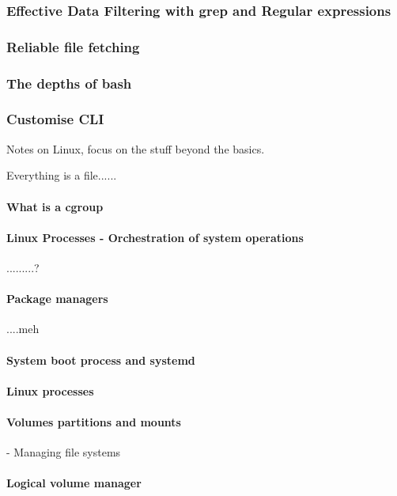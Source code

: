 \documentclass[a4paper, 11pt]{book}
\begin{document}
    \subsubsection{Effective Data Filtering with grep and Regular expressions}
    \subsubsection{Reliable file fetching}
    \subsubsection{The depths of bash}
    \subsubsection{Customise CLI}

    Notes on Linux, focus on the stuff beyond the basics.

    Everything is a file......

    \paragraph{What is a cgroup}

    \paragraph{Linux Processes - Orchestration of system operations}
    .........?

    \paragraph{Package managers}
    ....meh

    \paragraph{System boot process and systemd}

    \paragraph{Linux processes}

    \paragraph{Volumes partitions and mounts} - Managing file systems

    \paragraph{Logical volume manager}
\end{document}
